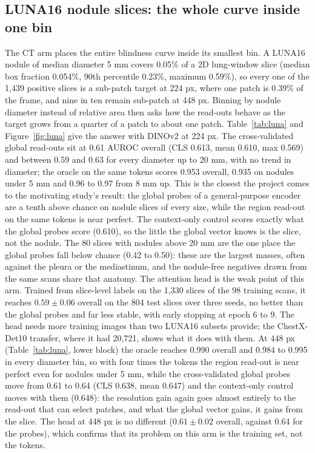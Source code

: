 \documentclass[10pt,letterpaper,twocolumn]{article}
\begin{document}
\subsection{LUNA16 nodule slices: the whole curve inside one bin}
\label{sec:luna}
The CT arm places the entire blindness curve inside its smallest bin. A LUNA16 nodule of
median diameter 5 mm covers 0.05\% of a 2D lung-window slice (median box fraction 0.054\%,
90th percentile 0.23\%, maximum 0.59\%), so every one of the 1,439 positive slices is a
sub-patch target at 224 px, where one patch is 0.39\% of the frame, and nine in ten remain
sub-patch at 448 px. Binning by nodule diameter instead of relative area then asks how the
read-outs behave as the target grows from a quarter of a patch to about one patch.
Table~\ref{tab:luna} and Figure~\ref{fig:luna} give the answer with DINOv2 at 224 px. The
cross-validated global read-outs sit at 0.61 AUROC overall (CLS 0.613, mean 0.610, max
0.569) and between 0.59 and 0.63 for every diameter up to 20 mm, with no trend in diameter;
the oracle on the same tokens scores 0.953 overall, 0.935 on nodules under 5 mm and 0.96 to
0.97 from 8 mm up. This is the closest the project comes to the motivating study's result:
the global probes of a general-purpose encoder are a tenth above chance on nodule slices of
every size, while the region read-out on the same tokens is near perfect. The context-only
control scores exactly what the global probes score (0.610), so the little the global vector
knows is the slice, not the nodule. The 80 slices with nodules above 20 mm are the one place
the global probes fall below chance (0.42 to 0.50): these are the largest masses, often
against the pleura or the mediastinum, and the nodule-free negatives drawn from the same
scans share that anatomy. The attention head is the weak point of this arm. Trained from
slice-level labels on the 1,330 slices of the 98 training scans, it reaches $0.59\pm0.06$
overall on the 804 test slices over three seeds, no better than the global probes and far
less stable, with early stopping at epoch 6 to 9. The head needs more training images than
two LUNA16 subsets provide; the ChestX-Det10 transfer, where it had 20,721, shows what it
does with them.
At 448 px (Table~\ref{tab:luna}, lower block) the oracle reaches 0.990 overall and 0.984 to
0.995 in every diameter bin, so with four times the tokens the region read-out is near perfect
even for nodules under 5 mm, while the cross-validated global probes move from 0.61 to 0.64
(CLS 0.638, mean 0.647) and the context-only control moves with them (0.648): the resolution
gain again goes almost entirely to the read-out that can select patches, and what the global
vector gains, it gains from the slice.
The head at 448 px is no different ($0.61\pm0.02$ overall, against 0.64 for the probes),
which confirms that its problem on this arm is the training set, not the tokens.
\end{document}
